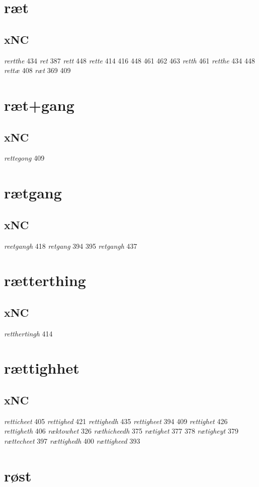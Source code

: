 \documentclass[a4paper,twocolumn]{article}
\begin{document}
\section{ræt}
\label{sec:org559830b}
\subsection{xNC}
\label{sec:org172fa40}
\emph{rertthe} 434 \emph{ret} 387 \emph{rett} 448 \emph{rette} 414 416 448 461 462 463 \emph{retth} 461 \emph{retthe} 434 448 \emph{rettæ} 408 \emph{ræt} 369 409 
\section{ræt+gang}
\label{sec:org556dcae}
\subsection{xNC}
\label{sec:org6a6ac4a}
\emph{rettegong} 409 
\section{rætgang}
\label{sec:org84fc035}
\subsection{xNC}
\label{sec:org5ed7f96}
\emph{reetgangh} 418 \emph{retgang} 394 395 \emph{retgangh} 437 
\section{rætterthing}
\label{sec:org4a69719}
\subsection{xNC}
\label{sec:org29b0cda}
\emph{retthertingh} 414 
\section{rættighhet}
\label{sec:orgcc5f0b8}
\subsection{xNC}
\label{sec:org50ea338}
\emph{retticheet} 405 \emph{rettighed} 421 \emph{rettighedh} 435 \emph{rettigheet} 394 409 \emph{rettighet} 426 \emph{rettigheth} 406 \emph{ræktowhet} 326 \emph{ræthicheedh} 375 \emph{rætighet} 377 378 \emph{rætigheyt} 379 \emph{rættecheet} 397 \emph{rættighedh} 400 \emph{rættigheed} 393 
\section{røst}
\label{sec:org533b3f8}
\end{document}

